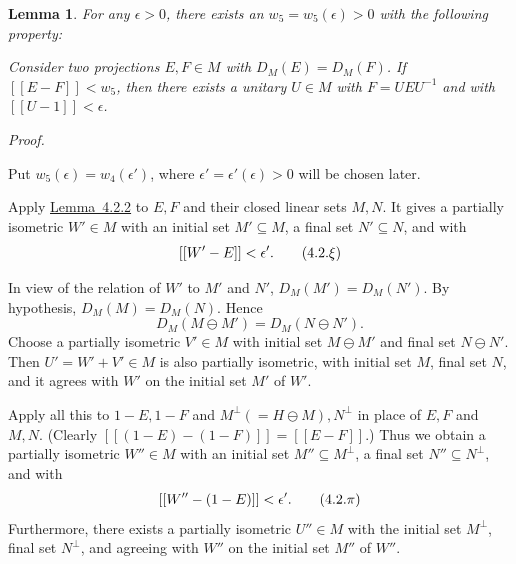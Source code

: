 \documentclass[b5paper,twoside]{article}
\newcommand{\lemref}[2]{\hyperref[#1]{\mbox{Lemma~#2}}}
\theoremstyle{mvnplain}
\newtheorem{lemma}{Lemma}[section]
\renewenvironment{proof}[1][Proof]{%
  \par\addvspace{0.35\baselineskip}%
  \noindent\textit{#1.}\ \normalfont\ignorespaces
}{%
  \par\addvspace{0.35\baselineskip}%
}
\newcommand{\M}{\mathbf M}
\newcommand{\Hilbert}{\mathfrak H}
\newcommand{\Metric}[1]{\left[\!\left[#1\right]\!\right]}
\def\M{M}%
\def\Hilbert{H}%
\def\Metric#1{[[#1]]}%
\def\mathfrak#1{#1}%
\begin{document}
\begin{lemma}\label{lem:4.2.4}
For any \(\epsilon>0\), there exists an
\(w_5=w_5(\epsilon)>0\) with the following property:

Consider two projections \(E,F\in\M\) with
\(D_{\M}(E)=D_{\M}(F)\). If \(\Metric{E-F}<w_5\), then there exists a
unitary \(U\in\M\) with \(F=UEU^{-1}\) and with
\(\Metric{U-1}<\epsilon\).
\end{lemma}

\begin{proof}
Put \(w_5(\epsilon)=w_4(\epsilon')\), where
\(\epsilon'=\epsilon'(\epsilon)>0\) will be chosen later.

Apply \lemref{lem:4.2.2}{4.2.2} to \(E,F\) and their closed linear sets
\(\mathfrak M,\mathfrak N\). It gives a partially isometric \(W'\in\M\)
with an initial set \(\mathfrak M'\subseteq\mathfrak M\), a final set
\(\mathfrak N'\subseteq\mathfrak N\), and with
\begin{equation}\label{eq:4.2.xi}
  \Metric{W'-E}<\epsilon'.
  \tag{4.2.\ensuremath{\xi}}
\end{equation}

In view of the relation of \(W'\) to \(\mathfrak M'\) and \(\mathfrak N'\),
\(D_{\M}(\mathfrak M')=D_{\M}(\mathfrak N')\). By hypothesis,
\(D_{\M}(\mathfrak M)=D_{\M}(\mathfrak N)\). Hence
\[
  D_{\M}(\mathfrak M\ominus\mathfrak M')
  =D_{\M}(\mathfrak N\ominus\mathfrak N').
\]
Choose a partially isometric \(V'\in\M\) with initial set
\(\mathfrak M\ominus\mathfrak M'\) and final set
\(\mathfrak N\ominus\mathfrak N'\). Then \(U'=W'+V'\in\M\) is also
partially isometric, with initial set \(\mathfrak M\), final set
\(\mathfrak N\), and it agrees with \(W'\) on the initial set
\(\mathfrak M'\) of \(W'\).

Apply all this to \(1-E,1-F\) and
\(\mathfrak M^{\perp}(=\Hilbert\ominus\mathfrak M),\mathfrak N^{\perp}\)
in place of \(E,F\) and \(\mathfrak M,\mathfrak N\). (Clearly
\(\Metric{(1-E)-(1-F)}=\Metric{E-F}\).) Thus we obtain a partially
isometric \(W''\in\M\) with an initial set
\(\mathfrak M''\subseteq\mathfrak M^{\perp}\), a final set
\(\mathfrak N''\subseteq\mathfrak N^{\perp}\), and with
\begin{equation}\label{eq:4.2.pi}
  \Metric{W''-(1-E)}<\epsilon'.
  \tag{4.2.\ensuremath{\pi}}
\end{equation}
Furthermore, there exists a partially isometric \(U''\in\M\) with the initial
set \(\mathfrak M^{\perp}\), final set \(\mathfrak N^{\perp}\), and agreeing
with \(W''\) on the initial set \(\mathfrak M''\) of \(W''\).


\end{proof}
\end{document}
